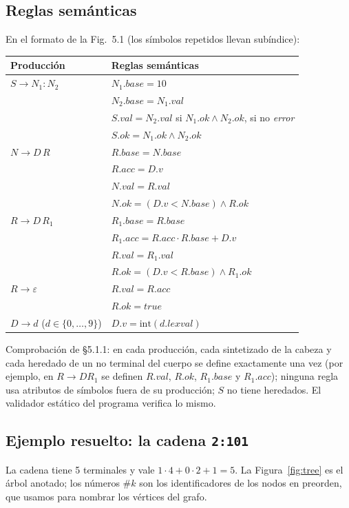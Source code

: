 \documentclass[11pt,a4paper]{article}
\newcommand{\eps}{\varepsilon}
\newcommand{\code}[1]{\texttt{#1}}
\begin{document}
\subsection{Reglas semánticas}
En el formato de la Fig.~5.1 (los símbolos repetidos llevan subíndice):

\begin{tabular}{ll}
\toprule
\textbf{Producción} & \textbf{Reglas semánticas}\\
\midrule
$S \to N_1 : N_2$ & $N_1.base = 10$\\
 & $N_2.base = N_1.val$\\
 & $S.val = N_2.val$ si $N_1.ok \wedge N_2.ok$, si no \emph{error}\\
 & $S.ok = N_1.ok \wedge N_2.ok$\\
\midrule
$N \to D\,R$ & $R.base = N.base$\\
 & $R.acc = D.v$\\
 & $N.val = R.val$\\
 & $N.ok = (D.v < N.base) \wedge R.ok$\\
\midrule
$R \to D\,R_1$ & $R_1.base = R.base$\\
 & $R_1.acc = R.acc \cdot R.base + D.v$\\
 & $R.val = R_1.val$\\
 & $R.ok = (D.v < R.base) \wedge R_1.ok$\\
\midrule
$R \to \eps$ & $R.val = R.acc$\\
 & $R.ok = \mathit{true}$\\
\midrule
$D \to d$ \quad ($d \in \{0,\dots,9\}$) & $D.v = \mathrm{int}(d.lexval)$\\
\bottomrule
\end{tabular}

\medskip
Comprobación de §5.1.1: en cada producción, cada sintetizado de la cabeza y cada heredado de un
no terminal del cuerpo se define exactamente una vez (por ejemplo, en $R \to DR_1$ se definen
$R.val$, $R.ok$, $R_1.base$ y $R_1.acc$); ninguna regla usa atributos de símbolos fuera de su
producción; $S$ no tiene heredados. El validador estático del programa verifica lo mismo.

\subsection{Ejemplo resuelto: la cadena \code{2:101}}
La cadena tiene 5 terminales y vale $1\cdot 4 + 0\cdot 2 + 1 = 5$. La Figura~\ref{fig:tree}
es el árbol anotado; los números \#$k$ son los identificadores de los nodos en preorden, que
usamos para nombrar los vértices del grafo.
\end{document}
